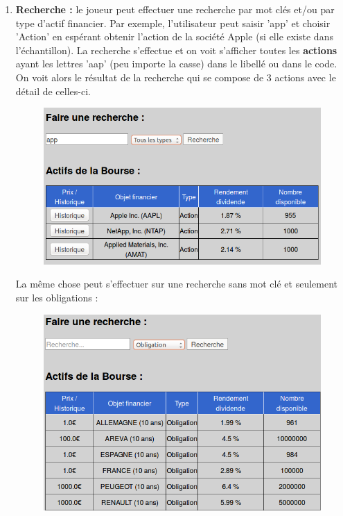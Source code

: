       \begin{enumerate}
       \item \textbf{Recherche :} le joueur peut effectuer une recherche par mot clés et/ou par type d'actif financier. Par exemple, l'utilisateur peut saisir 'app' et choisir 'Action' en espérant obtenir l'action de la société Apple (si elle existe dans l'échantillon). La recherche s'effectue et on voit s'afficher toutes les \textbf{actions} ayant les lettres 'aap' (peu importe la casse) dans le libellé ou dans le code. On voit alors le résultat de la recherche qui se compose de 3 actions avec le détail de celles-ci. 
      \begin{figure}[H]
	\center
	\includegraphics[scale=0.5]{../graph/5-rechercheactifs.png}
      \end{figure}
      
      La même chose peut s'effectuer sur une recherche sans mot clé et seulement sur les obligations :\\
      \begin{figure}[H]
	\center      
	\includegraphics[scale=0.5]{../graph/5-rechercheobligations.png}
      \end{figure}
      

\end{enumerate}
